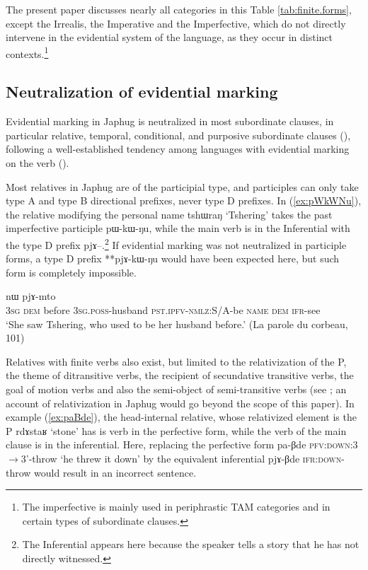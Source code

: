\documentclass[oldfontcommands,oneside,a4paper,11pt]{article}
\newcommand{\ipa}[1]{{\phon \mbox{#1}}} %
\newcommand{\refb}[1]{(\ref{#1})}
\begin{document}
The present paper discusses nearly all categories in this Table \ref{tab:finite.forms}, except the Irrealis, the Imperative and the Imperfective, which do not directly intervene in the evidential system of the language, as they occur in distinct contexts.\footnote{The imperfective is mainly used in periphrastic TAM categories and in certain types of subordinate clauses.}

\subsection{Neutralization of evidential marking} \label{sec:neutralization}
Evidential marking in Japhug is neutralized in most subordinate clauses, in particular relative, temporal, conditional, and purposive subordinate clauses (\citealt{jacques14linking}), following a well-established tendency among languages with evidential marking on the verb (\citealt[253-6]{aikhenvald06}).

Most relatives in Japhug are of the participial type, and participles can only take type A and type B directional prefixes, never type D prefixes. In \refb{ex:pWkWNu}, the relative modifying the personal name \ipa{tshɯraŋ} `Tshering' takes the past imperfective participle \ipa{pɯ-kɯ-ŋu}, while the main verb is in the Inferential with the type D prefix \ipa{pjɤ--}.\footnote{The Inferential appears here because the speaker tells a story that he has not directly witnessed.} If evidential marking was not neutralized in participle forms, a type D prefix **\ipa{pjɤ-kɯ-ŋu} would have been expected here, but such form is completely impossible.


\begin{exe}
\ex \label{ex:pWkWNu}
\gll [\ipa{ɯʑo} 	\ipa{nɯ} \ipa{ɕɯŋgɯ} 	\ipa{ɯ-nmaʁ}  \ipa{pɯ-kɯ-ŋu}] 	\ipa{tshɯraŋ} 	\ipa{nɯ} 	\ipa{pjɤ-mto} 	\\
\textsc{3sg} \textsc{dem} before \textsc{3sg.poss}-husband \textsc{pst.ipfv-nmlz}:S/A-be \textsc{name} \textsc{dem} \textsc{ifr}-see \\
\glt `She saw Tshering, who used to be her husband before.' (La parole du corbeau, 101)
\end{exe}

Relatives with finite verbs also exist, but limited to the relativization of the P, the theme of ditransitive verbs, the recipient of secundative transitive verbs, the goal of motion verbs and also the semi-object of semi-transitive verbs (see \citealt{jacques16relatives}; an account of relativization in Japhug would go beyond the scope of this paper). In example \refb{ex:paBde}, the head-internal relative, whose relativized element is the P \ipa{rdɤstaʁ}  `stone' has is verb in the perfective form, while the verb of the main clause is in the inferential. Here, replacing the perfective form \ipa{pa-βde} \textsc{pfv:down}:3$\rightarrow$3'-throw `he threw it down' by the equivalent inferential \ipa{pjɤ-βde}  \textsc{ifr:down}-throw would result in an incorrect sentence.
\end{document}
